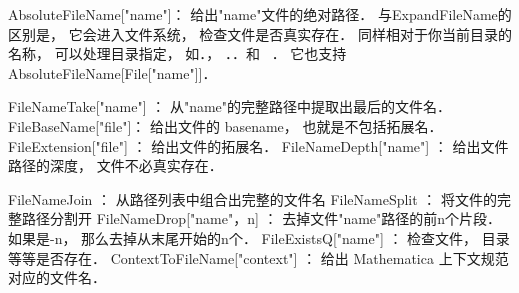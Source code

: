 AbsoluteFileName["name"]： 给出"name"文件的绝对路径． 与ExpandFileName的区别是， 它会进入文件系统， 检查文件是否真实存在．
同样相对于你当前目录的名称， 可以处理目录指定， 如．， ．．和 ~．
它也支持 AbsoluteFileName[File["name"]]．

FileNameTake["name"] ： 从"name"的完整路径中提取出最后的文件名．
FileBaseName["file"]： 给出文件的 basename， 也就是不包括拓展名．
FileExtension["file"]  ： 给出文件的拓展名．
FileNameDepth["name"] ： 给出文件路径的深度， 文件不必真实存在．

FileNameJoin ： 从路径列表中组合出完整的文件名
FileNameSplit ： 将文件的完整路径分割开
FileNameDrop["name"，n] ： 去掉文件"name"路径的前n个片段． 如果是-n， 那么去掉从末尾开始的n个．
FileExistsQ["name"]  ： 检查文件， 目录等等是否存在．
ContextToFileName["context"]  ： 给出 Mathematica 上下文规范对应的文件名．
